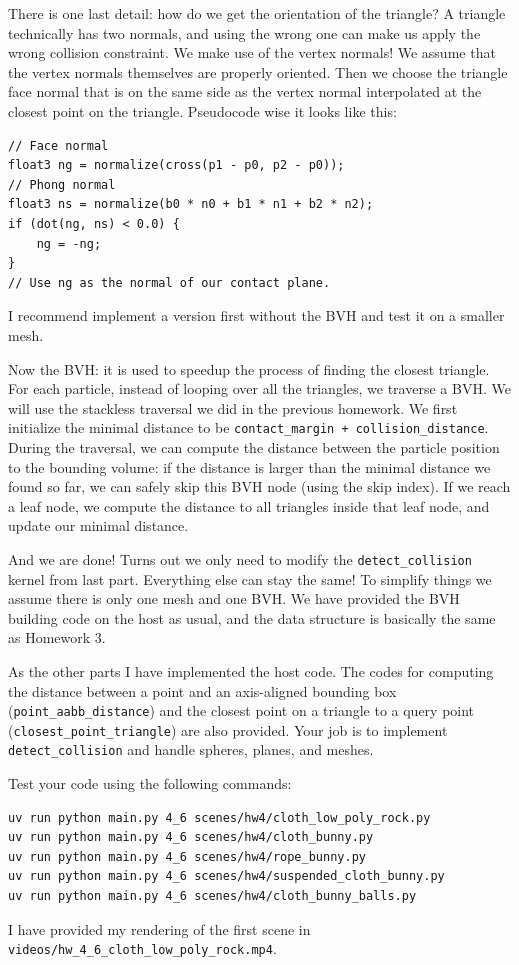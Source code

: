 There is one last detail: how do we get the orientation of the triangle? A triangle technically has two normals, and using the wrong one can make us apply the wrong collision constraint. We make use of the vertex normals! We assume that the vertex normals themselves are properly oriented. Then we choose the triangle face normal that is on the same side as the vertex normal interpolated at the closest point on the triangle. Pseudocode wise it looks like this:
\begin{lstlisting}[language=Slang]
// Face normal
float3 ng = normalize(cross(p1 - p0, p2 - p0));
// Phong normal
float3 ns = normalize(b0 * n0 + b1 * n1 + b2 * n2);
if (dot(ng, ns) < 0.0) {
    ng = -ng;
}
// Use ng as the normal of our contact plane.
\end{lstlisting}
I recommend implement a version first without the BVH and test it on a smaller mesh.

Now the BVH: it is used to speedup the process of finding the closest triangle. For each particle, instead of looping over all the triangles, we traverse a BVH. We will use the stackless traversal we did in the previous homework. We first initialize the minimal distance to be \lstinline{contact_margin + collision_distance}. During the traversal, we can compute the distance between the particle position to the bounding volume: if the distance is larger than the minimal distance we found so far, we can safely skip this BVH node (using the skip index). If we reach a leaf node, we compute the distance to all triangles inside that leaf node, and update our minimal distance. 

And we are done! Turns out we only need to modify the \lstinline{detect_collision} kernel from last part. Everything else can stay the same!
To simplify things we assume there is only one mesh and one BVH. We have provided the BVH building code on the host as usual, and the data structure is basically the same as Homework 3.

As the other parts I have implemented the host code. The codes for computing the distance between a point and an axis-aligned bounding box (\lstinline{point_aabb_distance}) and the closest point on a triangle to a query point (\lstinline{closest_point_triangle}) are also provided. Your job is to implement \lstinline{detect_collision} and handle spheres, planes, and meshes.

Test your code using the following commands:
\begin{lstlisting}[language=bash]
uv run python main.py 4_6 scenes/hw4/cloth_low_poly_rock.py
uv run python main.py 4_6 scenes/hw4/cloth_bunny.py
uv run python main.py 4_6 scenes/hw4/rope_bunny.py
uv run python main.py 4_6 scenes/hw4/suspended_cloth_bunny.py
uv run python main.py 4_6 scenes/hw4/cloth_bunny_balls.py
\end{lstlisting}
I have provided my rendering of the first scene in \lstinline{videos/hw_4_6_cloth_low_poly_rock.mp4}.

